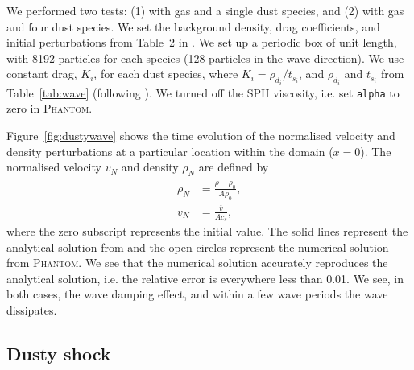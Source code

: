 \documentclass[fleqn,usenatbib]{mnras}
\begin{document}
We performed two tests: (1) with gas and a single dust species, and (2) with gas
and four dust species. We set the background density, drag coefficients, and
initial perturbations from Table~2 in
\citet{Benitez-Llambay2019ApJS..241...25B}. We set up a periodic box of unit
length, with 8192 particles for each species (128 particles in the wave
direction). We use constant drag, \(K_i\), for each dust species, where \(K_i =
\rho_{d_i} / t_{s_i}\), and \(\rho_{d_i}\) and \(t_{s_i}\) from
Table~\ref{tab:wave} (following \citet{Benitez-Llambay2019ApJS..241...25B}). We
turned off the SPH viscosity, i.e. set \texttt{alpha} to zero in
\textsc{Phantom}.

Figure~\ref{fig:dustywave} shows the time evolution of the normalised velocity
and density perturbations at a particular location within the domain (\(x=0\)).
The normalised velocity \( v_N \) and density \( \rho_N \) are defined by
%
\begin{align}
   \rho_N &= \frac{\overline{\rho} - \overline{\rho}_0}{A \overline{\rho}_0}, \\
   v_N &= \frac{\overline{v}}{A c_s},
\end{align}
%
where the zero subscript represents the initial value. The solid lines represent
the analytical solution from \citet{Benitez-Llambay2019ApJS..241...25B} and the
open circles represent the numerical solution from \textsc{Phantom}. We see that
the numerical solution accurately reproduces the analytical solution, i.e. the
relative error is everywhere less than 0.01. We see, in both cases, the wave
damping effect, and within a few wave periods the wave dissipates.

\subsection{Dusty shock}%
\label{subsec:shock}
\end{document}
